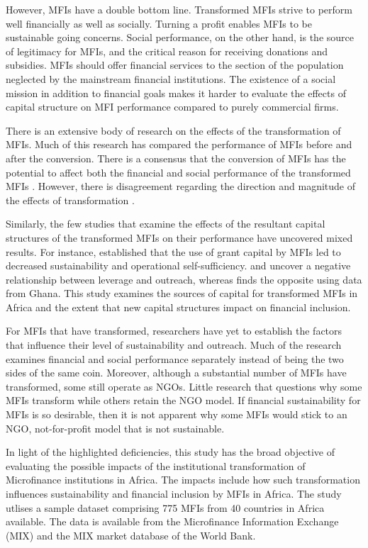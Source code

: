 \documentclass[a4paper, nobind]{templates/ociamthesis}
\begin{document}
However, MFIs have a double bottom line. Transformed MFIs strive to perform well financially as well as socially. Turning a profit enables MFIs to be sustainable going concerns. Social performance, on the other hand, is the source of legitimacy for MFIs, and the critical reason for receiving donations and subsidies. MFIs should offer financial services to the section of the population neglected by the mainstream financial institutions. The existence of a social mission in addition to financial goals makes it harder to evaluate the effects of capital structure on MFI performance compared to purely commercial firms.

There is an extensive body of research on the effects of the transformation of MFIs. Much of this research has compared the performance of MFIs before and after the conversion. There is a consensus that the conversion of MFIs has the potential to affect both the financial and social performance of the transformed MFIs \autocite{chahine2010social,mersland2010microfinance}. However, there is disagreement regarding the direction and magnitude of the effects of transformation \autocite{mersland2010microfinance,d2017ngos}.

Similarly, the few studies that examine the effects of the resultant capital structures of the transformed MFIs on their performance have uncovered mixed results. For instance, \textcite{bogan2012capital} established that the use of grant capital by MFIs led to decreased sustainability and operational self-sufficiency. \textcite{hoque2011commercialization} and \textcite{kar2012does} uncover a negative relationship between leverage and outreach, whereas \textcite{kyereboah2007determinants} finds the opposite using data from Ghana. This study examines the sources of capital for transformed MFIs in Africa and the extent that new capital structures impact on financial inclusion.

For MFIs that have transformed, researchers have yet to establish the factors that influence their level of sustainability and outreach. Much of the research examines financial and social performance separately instead of being the two sides of the same coin. Moreover, although a substantial number of MFIs have transformed, some still operate as NGOs. Little research that questions why some MFIs transform while others retain the NGO model. If financial sustainability for MFIs is so desirable, then it is not apparent why some MFIs would stick to an NGO, not-for-profit model that is not sustainable.

In light of the highlighted deficiencies, this study has the broad objective of evaluating the possible impacts of the institutional transformation of Microfinance institutions in Africa. The impacts include how such transformation influences sustainability and financial inclusion by MFIs in Africa. The study utlises a sample dataset comprising 775 MFIs from 40 countries in Africa available. The data is available from the Microfinance Information Exchange (MIX) and the MIX market database of the World Bank.
\end{document}
